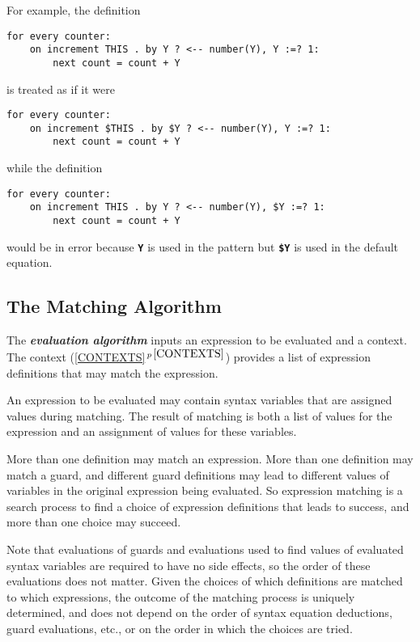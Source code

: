\documentclass[12pt]{article}
\newcommand{\TT}[1]{{\tt \bfseries #1}}
\newcommand{\key}[1]{{\bf \em #1}\index{#1}}
\newcommand{\secref}[1]{\ref{#1}$\,^{p\,\pageref{#1}}$}
\newenvironment{indpar}[1][0.3in]%
	{\begin{list}{}%
		     {\setlength{\itemsep}{0in}%
		      \setlength{\topsep}{0in}%
		      \setlength{\parsep}{1ex}%
		      \setlength{\labelwidth}{#1}%
		      \setlength{\leftmargin}{#1}%
		      \addtolength{\leftmargin}{\labelsep}}%
	 \item}%
	{\end{list}}
\begin{document}
For example, the definition

\begin{indpar}\begin{verbatim}
for every counter:
    on increment THIS . by Y ? <-- number(Y), Y :=? 1:
        next count = count + Y
\end{verbatim}\end{indpar}

is treated as if it were

\begin{indpar}\begin{verbatim}
for every counter:
    on increment $THIS . by $Y ? <-- number(Y), Y :=? 1:
        next count = count + Y
\end{verbatim}\end{indpar}

while the definition

\begin{indpar}\begin{verbatim}
for every counter:
    on increment THIS . by Y ? <-- number(Y), $Y :=? 1:
        next count = count + Y
\end{verbatim}\end{indpar}

would be in error because \TT{Y} is used in the pattern but
\TT{\$Y} is used in the default equation.

\subsection{The Matching Algorithm}
\label{MATCHING-ALGORITHM}

The \key{evaluation algorithm} inputs an expression to be evaluated
and a context.  The context (\secref{CONTEXTS}) provides a list of expression
definitions that may match the expression.

An expression to be evaluated may contain syntax variables that are assigned
values during matching.  The result of matching is both a list of values for
the expression and an assignment of values for these variables.

More than one definition may match an expression.
More than one definition may match a guard,
and different guard definitions may lead to different
values of variables in the original expression being evaluated.
So expression matching is a search process to find a choice
of expression definitions that
leads to success, and more than one choice may succeed.

Note that evaluations of guards and evaluations
used to find values of evaluated syntax variables are required to have
no side effects, so the order of these evaluations does not matter.
Given the choices of which definitions are matched to which expressions,
the outcome of the matching process is uniquely determined, and does not
depend on the order of syntax equation deductions, guard evaluations, etc.,
or on the order in which the choices are tried.
\end{document}
